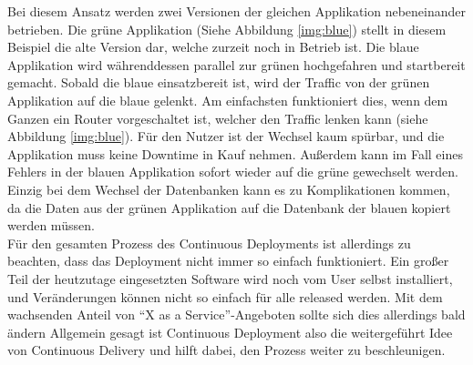 Bei diesem Ansatz werden zwei Versionen der gleichen Applikation nebeneinander betrieben. Die grüne Applikation (Siehe Abbildung \ref{img:blue}) stellt in diesem Beispiel die alte Version dar, welche zurzeit noch in Betrieb ist. Die blaue Applikation wird währenddessen parallel zur grünen hochgefahren und startbereit gemacht. Sobald die blaue einsatzbereit ist, wird der Traffic von der grünen Applikation auf die blaue gelenkt. Am einfachsten funktioniert dies, wenn dem Ganzen ein Router vorgeschaltet ist, welcher den Traffic lenken kann (siehe Abbildung \ref{img:blue}).\autocite[Vgl.][S.407]{Farley.2010} Für den Nutzer ist der Wechsel kaum spürbar, und die Applikation muss keine Downtime in Kauf nehmen. Außerdem kann im Fall eines Fehlers in der blauen Applikation sofort wieder auf die grüne gewechselt werden. Einzig bei dem Wechsel der Datenbanken kann es zu Komplikationen kommen, da die Daten aus der grünen Applikation auf die Datenbank der blauen kopiert werden müssen.\autocite[Vgl.][S.407]{Farley.2010}\\  
Für den gesamten Prozess des Continuous Deployments ist allerdings zu beachten, dass das Deployment nicht immer so einfach funktioniert. Ein großer Teil der heutzutage eingesetzten Software wird noch vom User selbst installiert, und Veränderungen können nicht so einfach für alle released werden. Mit dem wachsenden Anteil von \enquote{X as a Service}-Angeboten\autocite[S.18]{Stahl.2018} sollte sich dies allerdings bald ändern\autocite[Vgl.][S.18]{Stahl.2018} Allgemein gesagt ist Continuous Deployment also die weitergeführt Idee von Continuous Delivery und hilft dabei, den Prozess weiter zu beschleunigen.
